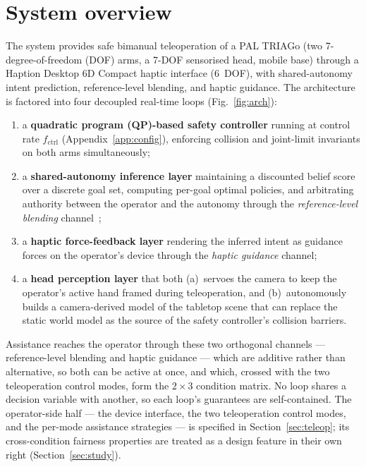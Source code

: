 \documentclass[12pt,a4paper,twoside,openright]{report}
\begin{document}
\section{System overview}
\label{sec:overview}

The system provides safe bimanual teleoperation of a PAL TRIAGo (two 7-degree-of-freedom (DOF) arms, a 7-DOF sensorised head, mobile base) through a Haption Desktop 6D Compact haptic interface (6~DOF), with shared-autonomy intent prediction, reference-level blending, and haptic guidance.
The architecture is factored into four decoupled real-time loops (Fig.~\ref{fig:arch}):
\begin{enumerate}[nosep]
\item a \textbf{quadratic program (QP)-based safety controller} running at control rate $f_{\text{ctrl}}$ (Appendix~\ref{app:config}), enforcing collision and joint-limit invariants on both arms simultaneously;
\item a \textbf{shared-autonomy inference layer} maintaining a discounted belief score over a discrete goal set, computing per-goal optimal policies, and arbitrating authority between the operator and the autonomy through the \emph{reference-level blending} channel~\cite{dragan2013policy,javdani2018hindsight,losey2018review};
\item a \textbf{haptic force-feedback layer} rendering the inferred intent as guidance forces on the operator's device through the \emph{haptic guidance} channel;
\item a \textbf{head perception layer} that both (a)~servoes the camera to keep the operator's active hand framed during teleoperation, and (b)~autonomously builds a camera-derived model of the tabletop scene that can replace the static world model as the source of the safety controller's collision barriers.
\end{enumerate}
Assistance reaches the operator through these two orthogonal channels --- reference-level blending and haptic guidance --- which are additive rather than alternative, so both can be active at once, and which, crossed with the two teleoperation control modes, form the $2\times3$ condition matrix. No loop shares a decision variable with another, so each loop's guarantees are self-contained. The operator-side half --- the device interface, the two teleoperation control modes, and the per-mode assistance strategies --- is specified in Section~\ref{sec:teleop}; its cross-condition fairness properties are treated as a design feature in their own right (Section~\ref{sec:study}).
\end{document}
